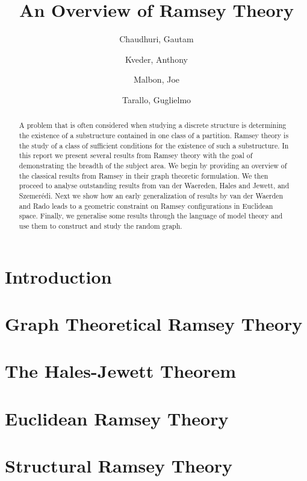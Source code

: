 \documentclass{article}
\title{An Overview of Ramsey Theory}
\author{
  Chaudhuri, Gautam\\
  \and
  Kveder, Anthony\\
  \and
  Malbon, Joe\\
  \and
  Tarallo, Guglielmo\\
}
\theoremstyle{BreakBold}
\theoremstyle{definition}
\theoremstyle{example}
\begin{document}
\begin{titlingpage}
\maketitle
\begin{abstract}
  A problem that is often considered when studying a discrete structure is
  determining the existence of a substructure contained in one class of a partition.
  Ramsey theory is the study of a class of sufficient conditions for the
  existence of such a substructure.
  In this report we present several results from Ramsey theory with the goal of
  demonstrating the breadth of the subject area.
  We begin by providing an overview of the classical results from Ramsey in
  their graph theoretic formulation.
  We then proceed to analyse outstanding results from van der Waereden, Hales
  and Jewett, and Szemerédi.
  Next we show how an early generalization of results by van der Waerden and
  Rado leads to a geometric constraint on Ramsey configurations in Euclidean
  space.
  Finally, we generalise some results through the language of model theory and
  use them to construct and study the random graph.
\end{abstract}
\tableofcontents
  
\end{titlingpage}

\section*{Introduction}
\label{sec:0}


\section{Graph Theoretical Ramsey Theory}
\label{sec:1}


\section{The Hales-Jewett Theorem}
\label{sec:2}

\newpage
\section{Euclidean Ramsey Theory}
\label{sec:3}


\newpage
\section{Structural Ramsey Theory}
\label{sec:4}


\printbibliography
\end{document}
